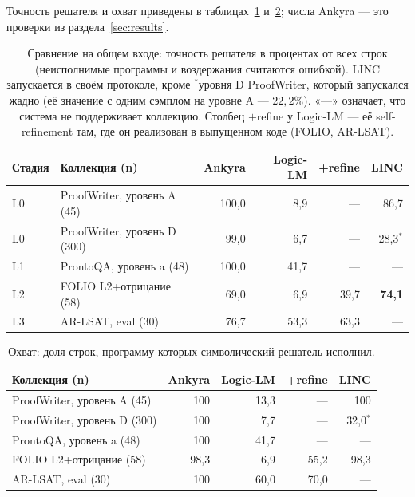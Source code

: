 \documentclass[11pt,a4paper]{article}
\begin{document}
Точность решателя и охват приведены в таблицах~\ref{tab:cmp-main} и~\ref{tab:cmp-cover}; числа Ankyra — это проверки из раздела~\ref{sec:results}.

\begin{table}[h]
\centering
\small
\begin{tabular}{llrrrr}
\toprule
\textbf{Стадия} & \textbf{Коллекция (n)} & \textbf{Ankyra} & \textbf{Logic-LM} & \textbf{+refine} & \textbf{LINC} \\
\midrule
L0 & ProofWriter, уровень A (45) & 100{,}0 & 8{,}9 & --- & 86{,}7 \\
L0 & ProofWriter, уровень D (300) & 99{,}0 & 6{,}7 & --- & 28{,}3$^{\ast}$ \\
L1 & ProntoQA, уровень a (48) & 100{,}0 & 41{,}7 & --- & --- \\
L2 & FOLIO L2+отрицание (58) & 69{,}0 & 6{,}9 & 39{,}7 & \textbf{74{,}1} \\
L3 & AR-LSAT, eval (30) & 76{,}7 & 53{,}3 & 63{,}3 & --- \\
\bottomrule
\end{tabular}
\caption{Сравнение на общем входе: точность решателя в процентах от всех строк (неисполнимые программы и воздержания считаются ошибкой). LINC запускается в своём протоколе, кроме $^{\ast}$уровня D ProofWriter, который запускался жадно (её значение с одним сэмплом на уровне A — $22{,}2\%$). «---» означает, что система не поддерживает коллекцию. Столбец $+$refine у Logic-LM — её self-refinement там, где он реализован в выпущенном коде (FOLIO, AR-LSAT).}
\label{tab:cmp-main}
\end{table}

\begin{table}[h]
\centering
\small
\begin{tabular}{lrrrr}
\toprule
\textbf{Коллекция (n)} & \textbf{Ankyra} & \textbf{Logic-LM} & \textbf{+refine} & \textbf{LINC} \\
\midrule
ProofWriter, уровень A (45) & 100 & 13{,}3 & --- & 100 \\
ProofWriter, уровень D (300) & 100 & 7{,}7 & --- & 32{,}0$^{\ast}$ \\
ProntoQA, уровень a (48) & 100 & 41{,}7 & --- & --- \\
FOLIO L2+отрицание (58) & 98{,}3 & 6{,}9 & 55{,}2 & 98{,}3 \\
AR-LSAT, eval (30) & 100 & 60{,}0 & 70{,}0 & --- \\
\bottomrule
\end{tabular}
\caption{Охват: доля строк, программу которых символический решатель исполнил.}
\label{tab:cmp-cover}
\end{table}
\end{document}
